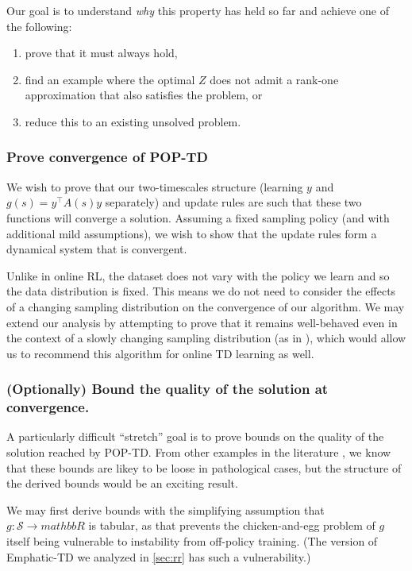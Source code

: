 \documentclass[11pt]{article}
\begin{document}
Our goal is to understand \emph{why} this property has held so far and achieve one of the following:
\begin{enumerate}
  \item prove that it must always hold,
  \item find an example where the optimal $Z$ does not admit a rank-one approximation that also satisfies the problem, or
  \item reduce this to an existing unsolved problem.
\end{enumerate}

\subsubsection{Prove convergence of POP-TD}

We wish to prove that our two-timescales structure (learning $y$ and $g(s) = y^\top A(s) y$ separately) and update rules are such that these two functions will converge a solution. Assuming a fixed sampling policy (and with additional mild assumptions), we wish to show that the update rules form a dynamical system that is convergent.

Unlike in online RL, the dataset does not vary with the policy we learn and so the data distribution is fixed. This means we do not need to consider the effects of a changing sampling distribution on the convergence of our algorithm. We may extend our analysis by attempting to prove that it remains well-behaved even in the context of a slowly changing sampling distribution (as in \cite{zhang2021breaking}), which would allow us to recommend this algorithm for online TD learning as well.


\subsubsection{(Optionally) Bound the quality of the solution at convergence. }

A particularly difficult ``stretch'' goal is to prove bounds on the quality of the solution reached by POP-TD. From other examples in the literature \cite{zhang2020provably,zhang2021breaking}, we know that these bounds are likey to be loose in pathological cases, but the structure of the derived bounds would be an exciting result.

We may first derive bounds with the simplifying assumption that $g : \mathcal S \to mathbb R$ is tabular, as that prevents the chicken-and-egg problem of $g$ itself being vulnerable to instability from off-policy training. (The version of Emphatic-TD we analyzed in \ref{sec:rr} has such a vulnerability.)
\end{document}
